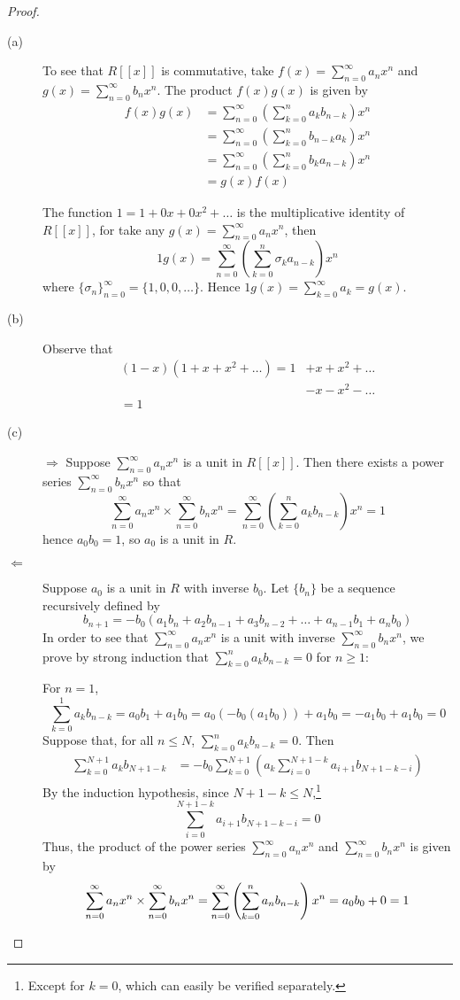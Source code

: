 \documentclass[12pt,leqno]{book}
\numberwithin{equation}{section}
\theoremstyle{definition}
\begin{document}
\begin{proof}\indent
 \begin{description}
  \item [(a)] To see that $R[[x]]$ is commutative, take $f(x)=\sum_{n=0}^{\infty}a_nx^n$ and $g(x)=\sum_{n=0}^{\infty}b_nx^n$. The product $f(x)g(x)$ is given by\begin{align*}f(x)g(x)&=\sum_{n=0}^{\infty}\left(\sum_{k=0}^na_kb_{n-k}\right)x^n\\&=\sum_{n=0}^{\infty}\left(\sum_{k=0}^nb_{n-k}a_k\right)x^n\\&=\sum_{n=0}^{\infty}\left(\sum_{k=0}^nb_ka_{n-k}\right)x^n\\&=g(x)f(x)\end{align*}

The function $1=1+0x+0x^2+\hdots$ is the multiplicative identity of $R[[x]]$, for take any $g(x)=\sum_{n=0}^{\infty}a_nx^n$, then \[1g(x)=\sum_{n=0}^{\infty}\left(\sum_{k=0}^n\sigma_ka_{n-k}\right)x^n\] where $\{\sigma_n\}_{n=0}^{\infty}=\{1,0,0,\hdots\}$. Hence $1g(x)=\sum_{k=0}^{\infty}a_k=g(x)$.
  \item [(b)] Observe that \begin{align*}(1-x)(1+x+x^2+\hdots)=1&+x+x^2+\hdots\\&-x-x^2-\hdots\\=1\end{align*}
  \item [(c)] $\Rightarrow$ Suppose $\sum_{n=0}^{\infty}a_nx^n$ is a unit in $R[[x]]$. Then there exists a power series $\sum_{n=0}^{\infty}b_nx^n$ so that \[\sum_{n=0}^{\infty}a_nx^n\times\sum_{n=0}^{\infty}b_nx^n=\sum_{n=0}^{\infty}\left(\sum_{k=0}^na_kb_{n-k}\right)x^n=1\] hence $a_0b_0=1$, so $a_0$ is a unit in $R$.
  \item [$\Leftarrow$] Suppose $a_0$ is a unit in $R$ with inverse $b_0$. Let $\{b_n\}$ be a sequence recursively defined by \[b_{n+1}=-b_0(a_1b_n+a_2b_{n-1}+a_3b_{n-2}+\hdots+a_{n-1}b_1+a_nb_0)\] In order to see that $\sum_{n=0}^{\infty}a_nx^n$ is a unit with inverse $\sum_{n=0}^{\infty}b_nx^n$, we prove by strong induction that $\sum_{k=0}^na_kb_{n-k}=0$ for $n\geq1$:

For $n=1$, \[\sum_{k=0}^1a_kb_{n-k}=a_0b_1+a_1b_0=a_0(-b_0(a_1b_0))+a_1b_0=-a_1b_0+a_1b_0=0\] Suppose that, for all $n\leq N$, $\sum_{k=0}^na_kb_{n-k}=0$. Then \begin{align*}\sum_{k=0}^{N+1}a_kb_{N+1-k}&=-b_0\sum_{k=0}^{N+1}\left(a_k\sum_{i=0}^{N+1-k}a_{i+1}b_{N+1-k-i}\right)\end{align*} By the induction hypothesis, since $N+1-k\leq N$,\footnote{Except for $k=0$, which can easily be verified separately.} \[\sum_{i=0}^{N+1-k}a_{i+1}b_{N+1-k-i}=0\] Thus, the product of the power series $\sum_{n=0}^{\infty}a_nx^n$ and $\sum_{n=0}^{\infty}b_nx^n$ is given by \[\sum_{n=0}^{\infty}a_nx^n\times\sum_{n=0}^{\infty}b_nx^n=\sum_{n=0}^{\infty}\left(\sum_{k=0}^na_nb_{n-k}\right)x^n=a_0b_0+0=1\qedhere\]
\end{description}

\end{proof}
\end{document}

